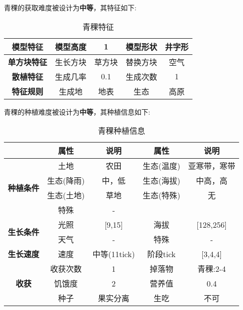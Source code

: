 青稞的获取难度被设计为\textbf{中等}，其特征如下:
\begin{table}[H]
    \centering
    \caption{青稞特征}
    \label{table:青稞特征}
    \setlength{\tabcolsep}{4mm}
    \begin{tabular}{c|cc|cc}
        \toprule
        \textbf{模型特征}                  & 模型高度 & 1      & 模型形状 & 井字形 \\
        \midrule
        \textbf{单方块特征}                & 生长方块 & 草方块 & 替换方块 & 空气   \\
        \midrule
        \textbf{散植特征}                  & 生成几率 & 0.1    & 生成次数 & 1      \\
        \midrule
        \multirow{1}{*}{\textbf{特征规则}} & 生成地   & 地表   & 生态     & 高原   \\
        \bottomrule
    \end{tabular}
\end{table}


青稞的种植难度被设计为\textbf{中等}，其种植信息如下:

\begin{table}[H]
    \centering
    \caption{青稞种植信息}
    \label{table:青稞种植信息}
    \setlength{\tabcolsep}{4mm}
    \begin{tabular}{c|cc|cc}
        \toprule
                                           & \textbf{属性} & \textbf{说明}   & \textbf{属性} & \textbf{说明} \\
        \midrule
        \multirow{4}{*}{\textbf{种植条件}} & 土地          & 农田            & 生态(温度)    & 亚寒带，寒带    \\
                                           & 生态(降雨)    & 中，低          & 生态(海拔)    & 中高，高       \\
                                           & 生态(土地)    & 草地            & 生态(特殊)    & 无            \\
                                           & 特殊          & -                                \\
        \midrule
        \multirow{2}{*}{\textbf{生长条件}} & 光照          & [9,15]         & 海拔          & [128,256]      \\
                                           & 天气          & -              & 特殊          & -      \\
        \midrule
        \textbf{生长速度}                  & 速度          & 中等(11tick)       & 阶段tick      & [3,4,4]       \\
        \midrule
        \multirow{3}{*}{\textbf{收获}}     & 收获次数      & 1               & 掉落物        & 青稞:2-4      \\
                                           & 饥饿度        & 2               & 营养值        & 0.4           \\
                                           & 种子          & 果实分离        & 生吃          & 不可          \\
        \bottomrule
    \end{tabular}
\end{table}

